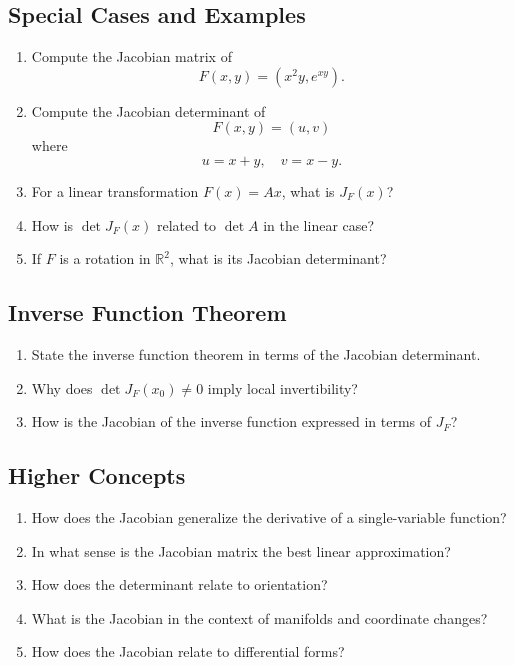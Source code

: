 \subsection{Special Cases and Examples}

\begin{enumerate}[resume]
  \item Compute the Jacobian matrix of
    \[ F(x,y) = (x^{2} y, e^{xy}). \]
  \item Compute the Jacobian determinant of
    \[ F(x,y) = (u,v) \]
    where
    \[ u = x+y, \quad v = x-y. \]
  \item For a linear transformation \(F(x)=Ax\), what is \(J_{F}(x)\)?
  \item How is \(\det J_{F}(x)\) related to \(\det A\) in the linear case?
  \item If \(F\) is a rotation in \(\mathbb{R}^{2}\), what is its Jacobian determinant?
\end{enumerate}

\subsection{Inverse Function Theorem}

\begin{enumerate}[resume]
  \item State the inverse function theorem in terms of the Jacobian determinant.
  \item Why does \(\det J_{F}(x_{0}) \neq 0\) imply local invertibility?
  \item How is the Jacobian of the inverse function expressed in terms of \(J_{F}\)?
\end{enumerate}

\subsection{Higher Concepts}

\begin{enumerate}[resume]
  \item How does the Jacobian generalize the derivative of a single-variable function?
  \item In what sense is the Jacobian matrix the best linear approximation?
  \item How does the determinant relate to orientation?
  \item What is the Jacobian in the context of manifolds and coordinate changes?
  \item How does the Jacobian relate to differential forms?
\end{enumerate}
